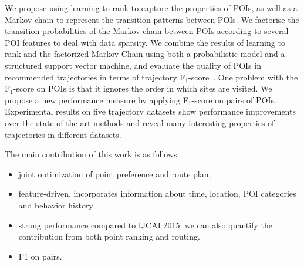 We propose using learning to rank to capture the properties of POIs, as well as a Markov chain to
represent the transition patterns between POIs.
We factorise the transition probabilities of the Markov chain between POIs
according to several POI features to deal with data sparsity.
We combine the results of learning to rank and the factorized Markov Chain using both a probabilistic model and a structured
support vector machine, and evaluate the quality of POIs in recommended trajectories in terms of trajectory F$_1$-score~\cite{ijcai15}. One problem with the F$_1$-score on POIs is that it ignores
the order in which sites are visited.
We propose a new performance measure by applying F$_1$-score on pairs of POIs.
Experimental results on five trajectory datasets show performance improvements over the state-of-the-art methods and
reveal many interesting properties of trajectories in different datasets.


The main contribution of this work is as follows: 
\begin{itemize}
\item joint optimization of point preference and route plan;
\item feature-driven, incorporates information about time, location, POI categories and behavior history
\item strong performance compared to IJCAI 2015. we can also quantify the contribution from both point ranking and routing.
\item F1 on pairs.
\end{itemize}
